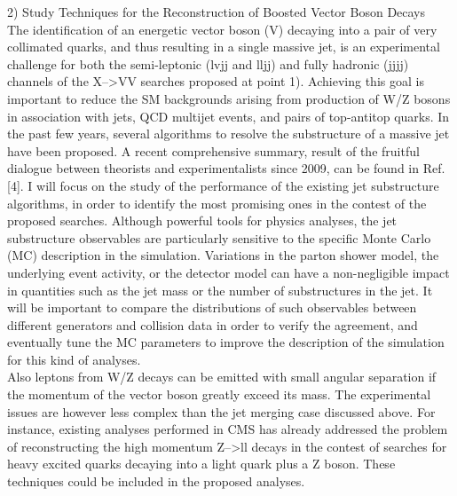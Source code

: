 \documentclass[10pt, a4paper]{article}
\begin{document}
2) Study Techniques for the Reconstruction of Boosted Vector Boson Decays\\
The identification of an energetic vector boson (V) decaying into a pair of 
very collimated quarks, and thus resulting in a single massive jet, is an experimental 
challenge for both the semi-leptonic (lvjj and lljj) and fully hadronic (jjjj) channels 
of the X-->VV searches proposed at point 1). Achieving this goal is important 
to reduce the SM backgrounds arising from production of W/Z bosons in 
association with jets, QCD multijet events, and pairs of top-antitop quarks.
In the past few years, several algorithms to resolve the substructure 
of a massive jet have been proposed. 
A recent comprehensive summary, result of the fruitful dialogue 
between theorists and experimentalists since 2009, can be found in Ref. [4]. 
I will focus on the study of the performance 
of the existing jet substructure algorithms, in order to identify the 
most promising ones in the contest of the proposed searches. 
Although powerful tools for physics analyses, 
the jet substructure observables are particularly sensitive 
to the specific Monte Carlo (MC) description in the simulation. 
Variations in the parton shower model, the underlying event 
activity, or the detector model can have a non-negligible impact 
in quantities such as the jet mass or the number of substructures in the jet. 
It will be important to compare the distributions of such observables 
between different generators and collision data in order to verify the agreement, 
and eventually tune the MC parameters to improve the description
of the simulation for this kind of analyses.\\
%
Also leptons from W/Z decays can be emitted with small angular separation 
if the momentum of the vector boson greatly exceed its mass. The experimental 
issues are however less complex than the jet merging case discussed above. 
For instance, existing analyses performed in CMS has already addressed the problem 
of reconstructing the high momentum Z-->ll decays in the contest of searches 
for heavy excited quarks decaying into a light quark plus a Z boson. These techniques 
could be included in the proposed analyses. \\
\end{document}
